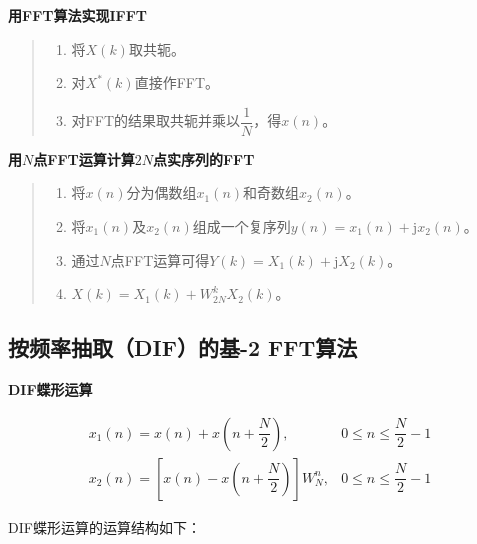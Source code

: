 \documentclass[cn, hazy, blue, normal, 14pt]{elegantnote}
\begin{document}
\textbf{用FFT算法实现IFFT}

\begin{quote}
\begin{enumerate}
    \item 将$X(k)$取共轭。
    \item 对$X^*(k)$直接作FFT。
    \item 对FFT的结果取共轭并乘以$\dfrac{1}{N}$，得$x(n)$。
\end{enumerate}
\end{quote}

\textbf{用$N$点FFT运算计算$2N$点实序列的FFT}

\begin{quote}
\begin{enumerate}
    \item 将$x(n)$分为偶数组$x_1(n)$和奇数组$x_2(n)$。
    \item 将$x_1(n)$及$x_2(n)$组成一个复序列$y(n)=x_1(n)+\text{j}x_2(n)$。
    \item 通过$N$点FFT运算可得$Y(k)=X_1(k)+\text{j}X_2(k)$。
    \item $X(k)=X_1(k)+W_{2N}^{k}X_2(k)$。
\end{enumerate}
\end{quote}

\subsection{按频率抽取（DIF）的基-2 FFT算法}

\textbf{DIF蝶形运算}

\begin{equation}
\begin{array}{ll}
    x_1(n)=x(n)+x\left(n+\dfrac{N}{2}\right), & 0\leq n\leq \dfrac{N}{2}-1 \\
    x_2(n)=\left[x(n)-x\left(n+\dfrac{N}{2}\right)\right]W_N^n, & 0\leq n\leq \dfrac{N}{2}-1
\end{array}
\end{equation}

DIF蝶形运算的运算结构如下：

\begin{center}
\end{center}
\end{document}
